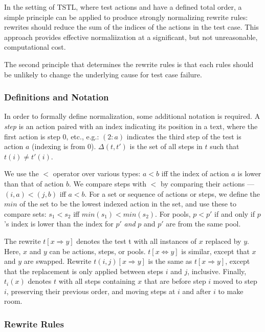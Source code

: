 In the setting of TSTL, where test actions and have a defined total
order, a simple principle can be applied to produce strongly
normalizing rewrite rules: rewrites should reduce the sum of the
indices of the actions in the test case.  This approach
provides effective normaliization at a significant, but not
unreasonable, computational cost.

The second principle that determines the rewrite rules is that each
rules should be unlikely to change the underlying cause for test case
failure.

\subsubsection{Definitions and Notation}

In order to formally define normalization, some additional notation is required.
A \emph{step} is an action paired with an index indicating its position in a text,
where the first action is step 0, etc., e.g.: $(2: a)$ indicates the
third step of the test is action $a$ (indexing is from 0). 
$\Delta(t,t')$ is the set of all steps in $t$ such that $t(i) \not= t'(i)$.

We use the $<$ operator over various types:
$a < b$ iff the index of action $a$ is lower
than that of action $b$.  We compare steps with $<$ by comparing their
actions --- $(i,a) < (j,b)$ iff $a < b$.  For a set or sequence of actions or steps, we define the $min$ of the
set to be the lowest indexed action in the set, and use
these to compare sets:  $s_1 < s_2$ iff $min(s_1) < min(s_2)$. For pools,
$p < p'$ if and only if $p$'s index is lower than the index for $p'$
\emph{and} $p$ and $p'$ are from the same pool.

The rewrite $t[x \Rightarrow y]$ denotes the test t with all instances of $x$
replaced by $y$.  Here, $x$ and $y$ can be actions, steps, or pools.
$t[x \Leftrightarrow y]$ is similar, except that $x$ and $y$ are
swapped.  Rewrite $t(i,j)[x \Rightarrow y]$ is the same as $t[x \Rightarrow
y]$, except that the replacement is only applied between steps $i$ and
$j$, inclusive.  Finally, $t_i(x)$ denotes $t$ with all steps
containing $x$ that are before step $i$ moved to step $i$, preserving
their previous order, and moving steps at $i$ and after $i$ to make room.

\subsubsection{Rewrite Rules}

